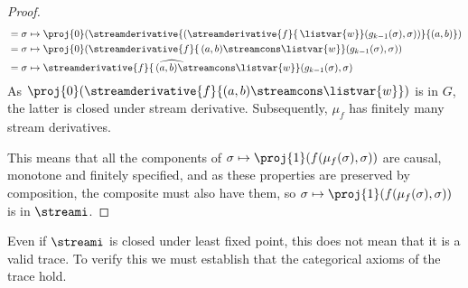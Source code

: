 \documentclass{lmcs}
\begin{document}
\begin{proof}
\begin{align*}
         & = \sigma \mapsto \proj{0}\mleft(\streamderivative{\left(\streamderivative{f}{\, \listvar{w}}(g_{k-1}(\sigma), \sigma)\right)}{(a,b)}\mright)                 \\
         & = \sigma \mapsto \proj{0}\mleft(\streamderivative{f}{\, (a,b) \streamcons \listvar{w}}(g_{k-1}(\sigma), \sigma)\mright)                                      \\
         & = \sigma \mapsto \widehat{\streamderivative{f}{\, (a,b) \streamcons \listvar{w}}}(g_{k-1}(\sigma), \sigma)
    \end{align*}
    As \(\proj{0}\mleft(\streamderivative{f}{(a,b) \streamcons \listvar{w}}\mright)\)
    is in \(G\), the latter  is closed under stream derivative.
    Subsequently, \(\mu_f\) has finitely many stream derivatives.

    This means that all the components of
    \(\sigma \mapsto \proj{1}(f(\mu_f(\sigma), \sigma))\) are causal, monotone and
    finitely specified, and as these properties are preserved by composition,
    the composite must also have them, so
    \(\sigma \mapsto \proj{1}(f(\mu_f(\sigma), \sigma))\) is in \(\streami\).
\end{proof}

Even if \(\streami\) is closed under least fixed point, this does not mean that
it is a valid trace.
To verify this we must establish that the categorical axioms of the trace hold.
\end{document}

